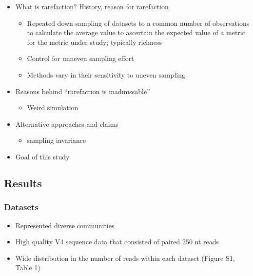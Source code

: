 \documentclass[
]{article}
\providecommand{\tightlist}{%
  \setlength{\itemsep}{0pt}\setlength{\parskip}{0pt}}
\begin{document}
\begin{itemize}
\tightlist
\item
  What is rarefaction? History, reason for rarefaction

  \begin{itemize}
  \tightlist
  \item
    Repeated down sampling of datasets to a common number of
    observations to calculate the average value to ascertain the
    expected value of a metric for the metric under study; typically
    richness
  \item
    Control for unneven sampling effort
  \item
    Methods vary in their sensitivity to uneven sampling
  \end{itemize}
\item
  Reasons behind ``rarefaction is inadmissable''

  \begin{itemize}
  \tightlist
  \item
    Weird simulation
  \end{itemize}
\item
  Alternative approaches and claims

  \begin{itemize}
  \tightlist
  \item
    sampling invariance
  \end{itemize}
\item
  Goal of this study
\end{itemize}

\hypertarget{results}{%
\subsection{Results}\label{results}}

\hypertarget{datasets}{%
\subsubsection{Datasets}\label{datasets}}

\begin{itemize}
\tightlist
\item
  Represented diverse communities
\item
  High quality V4 sequence data that consisted of paired 250 nt reads
\item
  Wide distribution in the number of reads within each dataset (Figure
  S1, Table 1)
\end{itemize}
\end{document}
